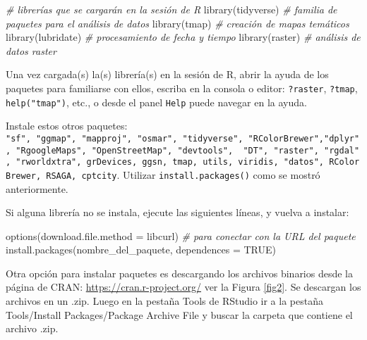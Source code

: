 \documentclass[
]{article}
\newenvironment{Shaded}{\begin{snugshade}}{\end{snugshade}}
\newcommand{\AttributeTok}[1]{\textcolor[rgb]{0.77,0.63,0.00}{#1}}
\newcommand{\CommentTok}[1]{\textcolor[rgb]{0.56,0.35,0.01}{\textit{#1}}}
\newcommand{\ConstantTok}[1]{\textcolor[rgb]{0.00,0.00,0.00}{#1}}
\newcommand{\FunctionTok}[1]{\textcolor[rgb]{0.00,0.00,0.00}{#1}}
\newcommand{\NormalTok}[1]{#1}
\newcommand{\StringTok}[1]{\textcolor[rgb]{0.31,0.60,0.02}{#1}}
\begin{document}
\begin{Shaded}
\begin{Highlighting}[]
\CommentTok{\# librerías que se cargarán en la sesión de R}
\FunctionTok{library}\NormalTok{(tidyverse)  }\CommentTok{\# familia de paquetes para el análisis de datos}
\FunctionTok{library}\NormalTok{(tmap)       }\CommentTok{\# creación de mapas temáticos}
\FunctionTok{library}\NormalTok{(lubridate)  }\CommentTok{\# procesamiento de fecha y tiempo}
\FunctionTok{library}\NormalTok{(raster)     }\CommentTok{\# análisis de datos raster}
\end{Highlighting}
\end{Shaded}

Una vez cargada(s) la(s) librería(s) en la sesión de R, abrir la ayuda
de los paquetes para familiarse con ellos, escriba en la consola o
editor: \texttt{?raster}, \texttt{?tmap}, \texttt{help("tmap")}, etc., o
desde el panel \texttt{Help} puede navegar en la ayuda.

Instale estos otros paquetes:
\texttt{"sf",\ "ggmap",\ "mapproj",\ "osmar",\ "tidyverse",\ "RColorBrewer","dplyr",\ "RgoogleMaps",\ "OpenStreetMap",\ "devtools",\ \ "DT",\ "raster",\ "rgdal",\ "rworldxtra",\ \textquotesingle{}grDevices\textquotesingle{},\ \textquotesingle{}ggsn\textquotesingle{},\ \textquotesingle{}tmap\textquotesingle{},\ \textquotesingle{}utils\textquotesingle{},\ \textquotesingle{}viridis\textquotesingle{},\ "datos",\ \textquotesingle{}RColorBrewer\textquotesingle{},\ \textquotesingle{}RSAGA\textquotesingle{},\ \textquotesingle{}cptcity\textquotesingle{}}.
Utilizar \texttt{install.packages()} como se mostró anteriormente.

Si alguna librería no se instala, ejecute las siguientes líneas, y
vuelva a instalar:

\begin{Shaded}
\begin{Highlighting}[]
\FunctionTok{options}\NormalTok{(}\AttributeTok{download.file.method =} \StringTok{\textquotesingle{}libcurl\textquotesingle{}}\NormalTok{) }\CommentTok{\# para conectar con la URL del paquete }
\FunctionTok{install.packages}\NormalTok{(}\StringTok{\textquotesingle{}nombre\_del\_paquete\textquotesingle{}}\NormalTok{, }\AttributeTok{dependences =} \ConstantTok{TRUE}\NormalTok{)}
\end{Highlighting}
\end{Shaded}

Otra opción para instalar paquetes es descargando los archivos binarios
desde la página de CRAN: \url{https://cran.r-project.org/} ver la Figura
\ref{fig2}. Se descargan los archivos en un .zip. Luego en la pestaña
Tools de RStudio ir a la pestaña Tools/Install Packages/Package Archive
File y buscar la carpeta que contiene el archivo .zip.
\end{document}

